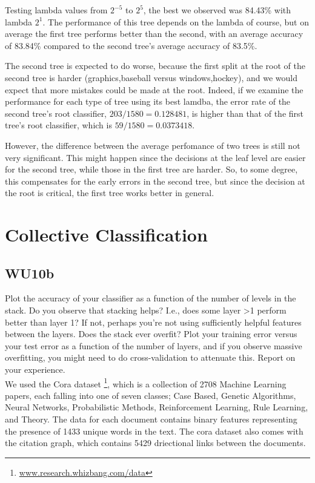 \documentclass[a4paper,11pt]{article}
\begin{document}
Testing lambda values from $2^{-5}$ to $2^{5}$, 
the best we observed was 84.43\% with lambda $2^1$.
The performance of this tree depends on the lambda  of course, but on
average the first tree performs better than the second, with an average accuracy
of 83.84\% compared to the second tree's average accuracy of 83.5\%. 

The second tree is expected to do worse, because the first split at the root of 
the second tree is harder ({graphics,baseball} versus {windows,hockey}),
and we would expect that more mistakes could be made at the root. 
Indeed, if we examine the performance for each type of tree using its best lamdba,
the error rate of the second tree's root classifier,
$203 / 1580 = 0.128481$, is higher than that of the first 
tree's root classifier, which is $59 / 1580 = 0.0373418$.

However, the difference between the average perfomance of two trees is still
not very significant. This might happen since the decisions at the leaf level
are easier for the second tree, while those in the first tree are harder.
So, to some degree, this compensates for the early errors in the second tree,
but since the decision at the root is critical, the first tree works better in general.

\pagebreak
\section{Collective Classification}
\subsection{WU10b}
\textsf{Plot the accuracy of your classifier as a function
  of the number of levels in the stack. Do you observe that stacking
  helps? I.e., does some layer >1 perform better than layer 1? If not,
  perhaps you're not using sufficiently helpful features between the
  layers. Does the stack ever overfit? Plot your training error versus
  your test error as a function of the number of layers, and if you
  observe massive overfitting, you might need to do cross-validation
  to attenuate this. Report on your experience.}\\

We used the Cora dataset \footnote{\url{www.research.whizbang.com/data}}, which is a collection of
2708 Machine Learning papers, each falling into one of seven
classes; Case Based, Genetic Algorithms, Neural Networks,
Probabilistic Methods, Reinforcement Learning, Rule Learning,
and Theory. The data for each document contains binary features representing
the presence of 1433 unique words in the text. The cora dataset 
also comes with the citation graph, 
which contains 5429 driectional links between the documents.
\end{document}
